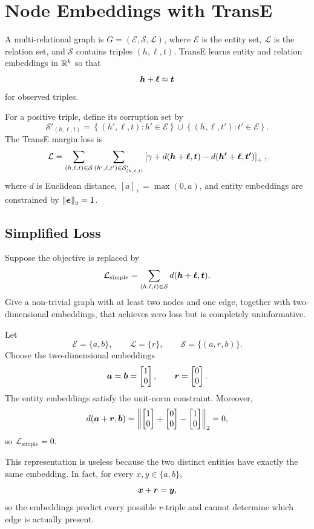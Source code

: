\clearpage
\section{Node Embeddings with TransE}

A multi-relational graph is \(G=(\mathcal E,\mathcal S,\mathcal L)\), where
\(\mathcal E\) is the entity set, \(\mathcal L\) is the relation set, and
\(\mathcal S\) contains triples \((h,\ell,t)\). TransE learns entity and
relation embeddings in \(\mathbb{R}^k\) so that
\[
  \bm{h}+\bm{\ell}\approx\bm{t}
\]
for observed triples.

For a positive triple, define its corruption set by
\[
  \mathcal S'_{(h,\ell,t)}
  =
  \left\{(h',\ell,t):h'\in\mathcal E\right\}
  \cup
  \left\{(h,\ell,t'):t'\in\mathcal E\right\}.
\]
The TransE margin loss is
\[
  \mathcal L
  =
  \sum_{(h,\ell,t)\in\mathcal S}
  \sum_{(h',\ell,t')\in\mathcal S'_{(h,\ell,t)}}
  \left[
    \gamma+
    d(\bm{h}+\bm{\ell},\bm{t})
    -d(\bm{h'}+\bm{\ell},\bm{t'})
  \right]_+,
\]
where \(d\) is Euclidean distance, \([a]_+=\max(0,a)\), and entity embeddings
are constrained by \(\left\lVert \bm{e} \right\rVert_2=1\).

\subsection{Simplified Loss}

Suppose the objective is replaced by
\[
  \mathcal L_{\mathrm{simple}}
  =
  \sum_{(h,\ell,t)\in\mathcal S}
  d(\bm{h}+\bm{\ell},\bm{t}).
\]
Give a non-trivial graph with at least two nodes and one edge, together with
two-dimensional embeddings, that achieves zero loss but is completely
uninformative.

\begin{solution}
Let
\[
  \mathcal E=\{a,b\},\qquad
  \mathcal L=\{r\},\qquad
  \mathcal S=\{(a,r,b)\}.
\]
Choose the two-dimensional embeddings
\[
  \bm{a}=\bm{b}=
  \begin{bmatrix}1\\0\end{bmatrix},
  \qquad
  \bm{r}=
  \begin{bmatrix}0\\0\end{bmatrix}.
\]
The entity embeddings satisfy the unit-norm constraint.  Moreover,
\[
  d(\bm{a}+\bm{r},\bm{b})
  =
  \left\lVert 
    \begin{bmatrix}1\\0\end{bmatrix}
    +
    \begin{bmatrix}0\\0\end{bmatrix}
    -
    \begin{bmatrix}1\\0\end{bmatrix}
   \right\rVert_2
  =0,
\]
so \(\mathcal L_{\mathrm{simple}}=0\).

This representation is useless because the two distinct entities have exactly
the same embedding.  In fact, for every \(x,y\in\{a,b\}\),
\[
  \bm{x}+\bm{r}=\bm{y},
\]
so the embeddings predict every possible \(r\)-triple and cannot determine
which edge is actually present.
\end{solution}

